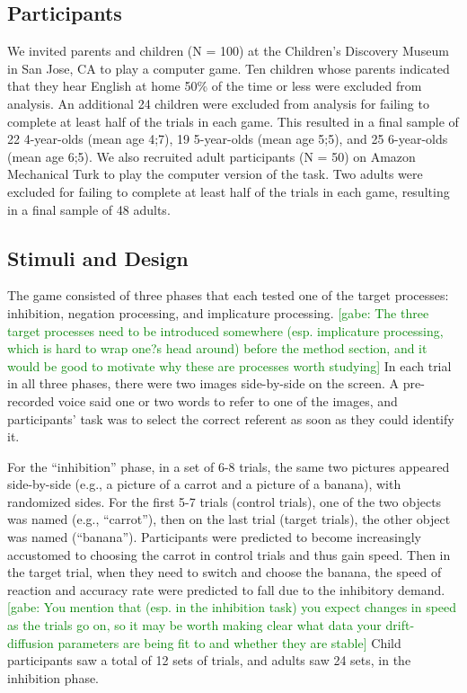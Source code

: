 \documentclass[10pt,letterpaper]{article}
\newcommand{\gabe}[1]{\textcolor{Green}{[gabe: #1]}}
\begin{document}
\subsection{Participants}

We invited parents and children (N = 100) at the Children's Discovery Museum in San Jose, CA to play a computer game.  Ten children whose parents indicated that they hear English at home 50\% of the time or less were excluded from analysis.  An additional 24 children were excluded from analysis for failing to complete at least half of the trials in each game.  This resulted in a final sample of 22 4-year-olds (mean age 4;7), 19 5-year-olds (mean age 5;5), and 25 6-year-olds (mean age 6;5).  We also recruited adult participants (N = 50) on Amazon Mechanical Turk to play the computer version of the task.  Two adults were excluded for failing to complete at least half of the trials in each game, resulting in a final sample of 48 adults.  

\subsection{Stimuli and Design}

The game consisted of three phases that each tested one of the target processes: inhibition, negation processing, and implicature processing. \gabe{The three target processes need to be introduced somewhere (esp. implicature processing, which is hard to wrap one?s head around) before the method section, and it would be good to motivate why these are processes worth studying} In each trial in all three phases, there were two images side-by-side on the screen. A pre-recorded voice said one or two words to refer to one of the images, and participants' task was to select the correct referent as soon as they could identify it.

For the ``inhibition'' phase, in a set of 6-8 trials, the same two pictures appeared side-by-side (e.g., a picture of a carrot and a picture of a banana), with randomized sides. For the first 5-7 trials (control trials), one of the two objects was named (e.g., ``carrot''), then on the last trial  (target trials), the other object was named (``banana''). Participants were predicted to become increasingly accustomed to choosing the carrot in control trials and thus gain speed. Then in the target trial, when they need to switch and choose the banana, the speed of reaction and accuracy rate were predicted to fall due to the inhibitory demand. \gabe{You mention that (esp. in the inhibition task) you expect changes in speed as the trials go on, so it may be worth making clear what data your drift-diffusion parameters are being fit to and whether they are stable} Child participants saw a total of 12 sets of trials, and adults saw 24 sets, in the inhibition phase.
\end{document}
